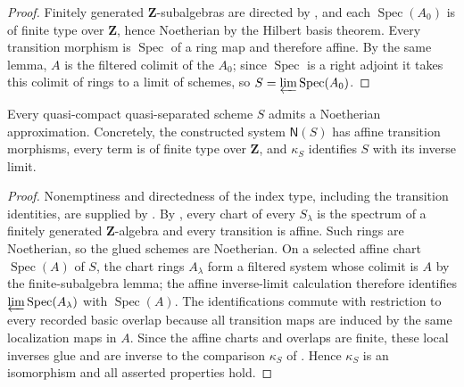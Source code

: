 \begin{proof}
  \leanok
  Finitely generated $\mathbf Z$-subalgebras are directed by
  , and each
  $\operatorname{Spec}(A_0)$ is of finite type over $\mathbf Z$, hence
  Noetherian by the Hilbert basis theorem.  Every transition morphism is
  $\operatorname{Spec}$ of a ring map and therefore affine.  By the same
  lemma, $A$ is the filtered colimit of the $A_0$; since $\operatorname{Spec}$
  is a right adjoint it takes this colimit of rings to a limit of schemes, so
  $S=\varprojlim\operatorname{Spec}(A_0)$.
\end{proof}

\begin{proposition}
  \label{prop:nagata-noetherian-inverse-system}
  \leanok

  Every quasi-compact quasi-separated scheme $S$ admits a Noetherian
  approximation.  Concretely, the constructed system $\mathsf N(S)$ has affine
  transition morphisms, every term is of finite type over $\mathbf Z$, and
  $\kappa_S$ identifies $S$ with its inverse limit.
\end{proposition}

\begin{proof}
  \leanok
  Nonemptiness and directedness of the index type, including the transition
  identities, are supplied by
  .  By
  , every chart of every $S_\lambda$
  is the spectrum of a finitely generated $\mathbf Z$-algebra and every
  transition is affine.  Such rings are Noetherian, so the glued schemes are
  Noetherian.  On a selected affine chart $\operatorname{Spec}(A)$ of $S$,
  the chart rings $A_\lambda$ form a filtered system whose colimit is $A$ by
  the finite-subalgebra lemma; the affine inverse-limit calculation therefore
  identifies $\varprojlim\operatorname{Spec}(A_\lambda)$ with
  $\operatorname{Spec}(A)$.  The identifications commute with restriction to
  every recorded basic overlap because all transition maps are induced by the
  same localization maps in $A$.  Since the affine charts and overlaps are
  finite, these local inverses glue and are inverse to the comparison
  $\kappa_S$ of .  Hence $\kappa_S$ is
  an isomorphism and all asserted properties hold.
\end{proof}

